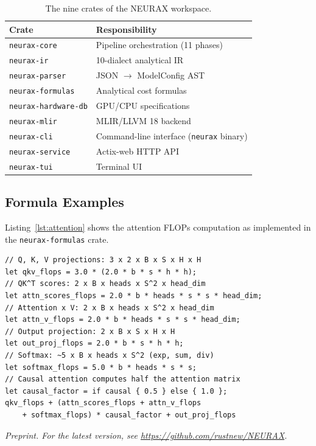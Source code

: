\documentclass[11pt]{article}
\begin{document}
\begin{table}[ht]
\centering
\caption{The nine crates of the NEURAX workspace.}
\begin{tabular}{@{}l l@{}}
\toprule
\textbf{Crate} & \textbf{Responsibility} \\
\midrule
\texttt{neurax-core} & Pipeline orchestration (11 phases) \\
\texttt{neurax-ir} & 10-dialect analytical IR \\
\texttt{neurax-parser} & JSON $\rightarrow$ ModelConfig AST \\
\texttt{neurax-formulas} & Analytical cost formulas \\
\texttt{neurax-hardware-db} & GPU/CPU specifications \\
\texttt{neurax-mlir} & MLIR/LLVM 18 backend \\
\texttt{neurax-cli} & Command-line interface (\texttt{neurax} binary) \\
\texttt{neurax-service} & Actix-web HTTP API \\
\texttt{neurax-tui} & Terminal UI \\
\bottomrule
\end{tabular}
\label{tab:crates}
\end{table}

\subsection{Formula Examples}

Listing~\ref{lst:attention} shows the attention FLOPs computation as implemented in the \texttt{neurax-formulas} crate.

\begin{lstlisting}[language=RustModern,caption={Attention FLOPs (abridged, neurax-formulas/src/attention.rs).},label={lst:attention}]
// Q, K, V projections: 3 x 2 x B x S x H x H
let qkv_flops = 3.0 * (2.0 * b * s * h * h);
// QK^T scores: 2 x B x heads x S^2 x head_dim
let attn_scores_flops = 2.0 * b * heads * s * s * head_dim;
// Attention x V: 2 x B x heads x S^2 x head_dim
let attn_v_flops = 2.0 * b * heads * s * s * head_dim;
// Output projection: 2 x B x S x H x H
let out_proj_flops = 2.0 * b * s * h * h;
// Softmax: ~5 x B x heads x S^2 (exp, sum, div)
let softmax_flops = 5.0 * b * heads * s * s;
// Causal attention computes half the attention matrix
let causal_factor = if causal { 0.5 } else { 1.0 };
qkv_flops + (attn_scores_flops + attn_v_flops
    + softmax_flops) * causal_factor + out_proj_flops
\end{lstlisting}

\vspace{1em}
\noindent\textit{Preprint. For the latest version, see \url{https://github.com/rustnew/NEURAX}.}
\end{document}
